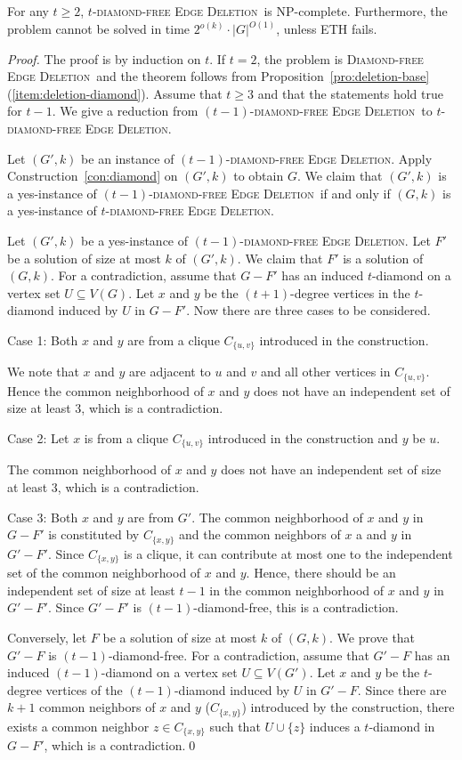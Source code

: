 \documentclass[envcountsame,envcountsect,10pt,oribibl]{llncs}
\newcommand{\pname}[1]{\textnormal{\textsc{#1}}}
\newcommand{\cclass}[1]{\textnormal{\textsf{#1}}}
\newcommand{\TDDED}{\pname{$t$-diamond-free Edge Deletion}}
\newcommand{\TODDED}{\pname{$(t-1)$-diamond-free Edge Deletion}}
\newcommand{\DED}{\pname{Diamond-free Edge Deletion}}
\newcommand{\NPC}{\cclass{NP-complete}}
\begin{document}
\begin{lemma}
  \label{lem:tdiamond}
  For any $t\geq 2$, \TDDED\ is \NPC. Furthermore,
  the problem cannot be solved in time $2^{o(k)}\cdot |G|^{O(1)}$, unless
  ETH fails.
\end{lemma}
\begin{proof}
  The proof is by induction on $t$. If $t=2$, the problem is \DED\ and the 
  theorem follows from Proposition~\ref{pro:deletion-base}(\ref{item:deletion-diamond}). 
  Assume that $t\geq 3$ and that the statements hold true for $t-1$.
  We give a reduction from \TODDED\ to \TDDED. 

  Let $(G',k)$ be an instance of \TODDED. Apply Construction~\ref{con:diamond}
  on $(G',k)$ to obtain $G$. We claim that $(G',k)$ is a yes-instance of \TODDED\
  if and only if $(G,k)$ is a yes-instance of \TDDED. 

  Let $(G',k)$ be a yes-instance of \TODDED. Let $F'$ be a solution of size 
  at most $k$ of $(G',k)$. We claim that $F'$ is a solution of $(G,k)$.
  For a contradiction, assume that $G-F'$ has an induced $t$-diamond on a 
  vertex set $U\subseteq V(G)$. Let $x$ and $y$ be the $(t+1)$-degree vertices in 
  the $t$-diamond induced by $U$ in $G-F'$. Now there are three cases to be considered.
  
  Case 1: Both $x$ and $y$ are 
  from a clique $C_{\{u,v\}}$ introduced in the construction. 

  We note that $x$ and $y$
  are adjacent to $u$ and $v$ and all other vertices in $C_{\{u,v\}}$. Hence the common neighborhood
  of $x$ and $y$ does not have an independent set of size at least $3$, which is a contradiction.

  Case 2: Let $x$ is from a clique $C_{\{u,v\}}$ introduced in the construction and $y$ be $u$.

  The common neighborhood
  of $x$ and $y$ does not have an independent set of size at least $3$, which is a contradiction.

  Case 3: Both $x$ and $y$ are from $G'$. The common neighborhood of $x$ and $y$ in $G-F'$
  is constituted by $C_{\{x,y\}}$ and the common neighbors of $x$ a and $y$ in $G'-F'$.
  Since $C_{\{x,y\}}$ is a clique, it can contribute at most one to the independent set of the 
  common neighborhood of $x$ and $y$. Hence, there should be an independent set of size at least $t-1$
  in the common neighborhood of $x$ and $y$ in $G'-F'$. Since $G'-F'$ is $(t-1)$-diamond-free, this is a contradiction.

  Conversely, let $F$ be a solution of size at most $k$ of $(G,k)$. We prove that $G'-F$ is $(t-1)$-diamond-free.
  For a contradiction, assume that $G'-F$ has an induced $(t-1)$-diamond on a vertex set $U\subseteq V(G')$.
  Let $x$ and $y$ be the $t$-degree vertices of the $(t-1)$-diamond induced by $U$ in $G'-F$.
  Since there are $k+1$ common neighbors of $x$ and $y$ ($C_{\{x,y\}}$) introduced by the construction, 
  there exists a common neighbor $z\in C_{\{x,y\}}$ such that $U\cup \{z\}$
  induces a $t$-diamond in $G-F'$, which is a contradiction.\qed
\end{proof}
\end{document}
